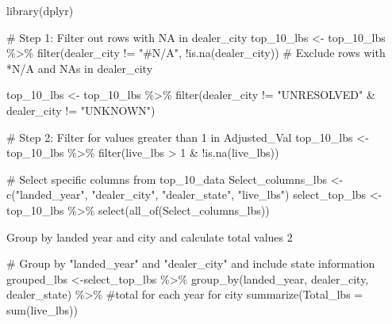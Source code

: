 \documentclass[
  letterpaper,
  DIV=11,
  numbers=noendperiod]{scrartcl}
\newenvironment{Shaded}{\begin{snugshade}}{\end{snugshade}}
\newcommand{\AttributeTok}[1]{\textcolor[rgb]{0.40,0.45,0.13}{#1}}
\newcommand{\CommentTok}[1]{\textcolor[rgb]{0.37,0.37,0.37}{#1}}
\newcommand{\DecValTok}[1]{\textcolor[rgb]{0.68,0.00,0.00}{#1}}
\newcommand{\FunctionTok}[1]{\textcolor[rgb]{0.28,0.35,0.67}{#1}}
\newcommand{\NormalTok}[1]{\textcolor[rgb]{0.00,0.23,0.31}{#1}}
\newcommand{\OtherTok}[1]{\textcolor[rgb]{0.00,0.23,0.31}{#1}}
\newcommand{\SpecialCharTok}[1]{\textcolor[rgb]{0.37,0.37,0.37}{#1}}
\newcommand{\StringTok}[1]{\textcolor[rgb]{0.13,0.47,0.30}{#1}}
\begin{document}
\begin{Shaded}
\begin{Highlighting}[]
\FunctionTok{library}\NormalTok{(dplyr)}

\CommentTok{\# Step 1: Filter out rows with NA in dealer\_city}
\NormalTok{top\_10\_lbs }\OtherTok{\textless{}{-}}\NormalTok{ top\_10\_lbs }\SpecialCharTok{\%\textgreater{}\%}
  \FunctionTok{filter}\NormalTok{(dealer\_city }\SpecialCharTok{!=} \StringTok{"\#N/A"}\NormalTok{, }\SpecialCharTok{!}\FunctionTok{is.na}\NormalTok{(dealer\_city))  }\CommentTok{\# Exclude rows with *N/A and NAs in dealer\_city}

\NormalTok{top\_10\_lbs }\OtherTok{\textless{}{-}}\NormalTok{ top\_10\_lbs }\SpecialCharTok{\%\textgreater{}\%}
  \FunctionTok{filter}\NormalTok{(dealer\_city }\SpecialCharTok{!=} \StringTok{"UNRESOLVED"} \SpecialCharTok{\&}\NormalTok{ dealer\_city }\SpecialCharTok{!=} \StringTok{"UNKNOWN"}\NormalTok{)}


\CommentTok{\# Step 2: Filter for values greater than 1 in Adjusted\_Val}
\NormalTok{top\_10\_lbs }\OtherTok{\textless{}{-}}\NormalTok{ top\_10\_lbs }\SpecialCharTok{\%\textgreater{}\%}
  \FunctionTok{filter}\NormalTok{(live\_lbs }\SpecialCharTok{\textgreater{}} \DecValTok{1} \SpecialCharTok{\&} \SpecialCharTok{!}\FunctionTok{is.na}\NormalTok{(live\_lbs))}

\CommentTok{\# Select specific columns from top\_10\_data}
\NormalTok{Select\_columns\_lbs }\OtherTok{\textless{}{-}} \FunctionTok{c}\NormalTok{(}\StringTok{"landed\_year"}\NormalTok{, }\StringTok{"dealer\_city"}\NormalTok{, }\StringTok{"dealer\_state"}\NormalTok{, }\StringTok{"live\_lbs"}\NormalTok{)}
\NormalTok{select\_top\_lbs }\OtherTok{\textless{}{-}}\NormalTok{ top\_10\_lbs }\SpecialCharTok{\%\textgreater{}\%}
  \FunctionTok{select}\NormalTok{(}\FunctionTok{all\_of}\NormalTok{(Select\_columns\_lbs))}
\end{Highlighting}
\end{Shaded}

Group by landed year and city and calculate total values 2

\begin{Shaded}
\begin{Highlighting}[]
\CommentTok{\# Group by "landed\_year" and "dealer\_city" and include state information}
\NormalTok{grouped\_lbs }\OtherTok{\textless{}{-}}\NormalTok{select\_top\_lbs }\SpecialCharTok{\%\textgreater{}\%}
  \FunctionTok{group\_by}\NormalTok{(landed\_year, dealer\_city, dealer\_state) }\SpecialCharTok{\%\textgreater{}\%} \CommentTok{\#total for each year for city}
  \FunctionTok{summarize}\NormalTok{(}\AttributeTok{Total\_lbs =} \FunctionTok{sum}\NormalTok{(live\_lbs))}
\end{Highlighting}
\end{Shaded}
\end{document}

